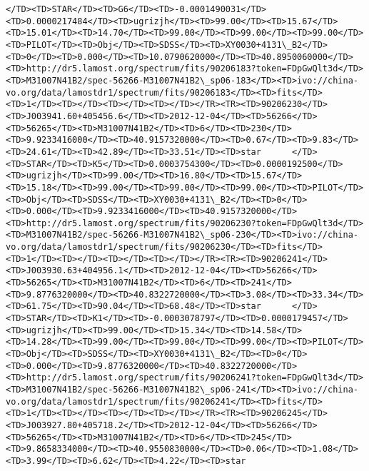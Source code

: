 \documentclass[11pt]{article}
\begin{document}
\begin{Verbatim}[commandchars=\\\{\}]
    </TD><TD>STAR</TD><TD>G6</TD><TD>-0.0001490031</TD><TD>0.0000217484</TD><TD>ugrizjh</TD><TD>99.00</TD><TD>15.67</TD><TD>15.01</TD><TD>14.70</TD><TD>99.00</TD><TD>99.00</TD><TD>99.00</TD><TD>PILOT</TD><TD>Obj</TD><TD>SDSS</TD><TD>XY0030+4131\_B2</TD><TD>0</TD><TD>0.000</TD><TD>10.0790620000</TD><TD>40.8950060000</TD><TD>http://dr5.lamost.org/spectrum/fits/90206183?token=FDpGwQlt3d</TD><TD>M31007N41B2/spec-56266-M31007N41B2\_sp06-183</TD><TD>ivo://china-vo.org/data/lamostdr1/spectrum/fits/90206183</TD><TD>fits</TD><TD>1</TD><TD></TD><TD></TD><TD></TD></TR><TR><TD>90206230</TD><TD>J003941.60+405456.6</TD><TD>2012-12-04</TD><TD>56266</TD><TD>56265</TD><TD>M31007N41B2</TD><TD>6</TD><TD>230</TD><TD>9.9233416000</TD><TD>40.9157320000</TD><TD>0.67</TD><TD>9.83</TD><TD>24.61</TD><TD>42.89</TD><TD>33.51</TD><TD>star      </TD><TD>STAR</TD><TD>K5</TD><TD>0.0003754300</TD><TD>0.0000192500</TD><TD>ugrizjh</TD><TD>99.00</TD><TD>16.80</TD><TD>15.67</TD><TD>15.18</TD><TD>99.00</TD><TD>99.00</TD><TD>99.00</TD><TD>PILOT</TD><TD>Obj</TD><TD>SDSS</TD><TD>XY0030+4131\_B2</TD><TD>0</TD><TD>0.000</TD><TD>9.9233416000</TD><TD>40.9157320000</TD><TD>http://dr5.lamost.org/spectrum/fits/90206230?token=FDpGwQlt3d</TD><TD>M31007N41B2/spec-56266-M31007N41B2\_sp06-230</TD><TD>ivo://china-vo.org/data/lamostdr1/spectrum/fits/90206230</TD><TD>fits</TD><TD>1</TD><TD></TD><TD></TD><TD></TD></TR><TR><TD>90206241</TD><TD>J003930.63+404956.1</TD><TD>2012-12-04</TD><TD>56266</TD><TD>56265</TD><TD>M31007N41B2</TD><TD>6</TD><TD>241</TD><TD>9.8776320000</TD><TD>40.8322720000</TD><TD>3.08</TD><TD>33.34</TD><TD>61.75</TD><TD>90.04</TD><TD>68.48</TD><TD>star      </TD><TD>STAR</TD><TD>K1</TD><TD>-0.0003078797</TD><TD>0.0000179457</TD><TD>ugrizjh</TD><TD>99.00</TD><TD>15.34</TD><TD>14.58</TD><TD>14.28</TD><TD>99.00</TD><TD>99.00</TD><TD>99.00</TD><TD>PILOT</TD><TD>Obj</TD><TD>SDSS</TD><TD>XY0030+4131\_B2</TD><TD>0</TD><TD>0.000</TD><TD>9.8776320000</TD><TD>40.8322720000</TD><TD>http://dr5.lamost.org/spectrum/fits/90206241?token=FDpGwQlt3d</TD><TD>M31007N41B2/spec-56266-M31007N41B2\_sp06-241</TD><TD>ivo://china-vo.org/data/lamostdr1/spectrum/fits/90206241</TD><TD>fits</TD><TD>1</TD><TD></TD><TD></TD><TD></TD></TR><TR><TD>90206245</TD><TD>J003927.80+405718.2</TD><TD>2012-12-04</TD><TD>56266</TD><TD>56265</TD><TD>M31007N41B2</TD><TD>6</TD><TD>245</TD><TD>9.8658334000</TD><TD>40.9550830000</TD><TD>0.06</TD><TD>1.08</TD><TD>3.99</TD><TD>6.62</TD><TD>4.22</TD><TD>star      
\end{Verbatim}
\end{document}
